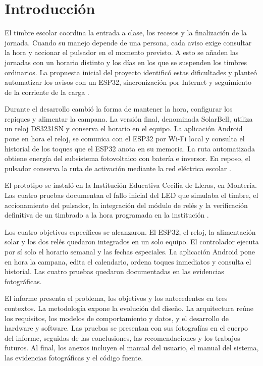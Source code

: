 \documentclass[a4paper,11pt]{article}
\newcommand{\seccionsinnumero}[1]{%
  \section*{#1}\phantomsection\addcontentsline{toc}{section}{#1}}
\begin{document}
\tableofcontents
\clearpage

\seccionsinnumero{Introducción}
El timbre escolar coordina la entrada a clase, los recesos y la finalización de la jornada. Cuando su manejo depende de una persona, cada aviso exige consultar la hora y accionar el pulsador en el momento previsto. A esto se añaden las jornadas con un horario distinto y los días en los que se suspenden los timbres ordinarios. La propuesta inicial del proyecto identificó estas dificultades y planteó automatizar los avisos con un ESP32, sincronización por Internet y seguimiento de la corriente de la carga \cite{propuesta}.

Durante el desarrollo cambió la forma de mantener la hora, configurar los repiques y alimentar la campana. La versión final, denominada SolarBell, utiliza un reloj DS3231SN y conserva el horario en el equipo. La aplicación Android pone en hora el reloj, se comunica con el ESP32 por Wi-Fi local y consulta el historial de los toques que el ESP32 anota en su memoria. La ruta automatizada obtiene energía del subsistema fotovoltaico con batería e inversor. En reposo, el pulsador conserva la ruta de activación mediante la red eléctrica escolar \cite{ficha,diagrama,evidencia}.

El prototipo se instaló en la Institución Educativa Cecilia de Lleras, en Montería. Las cuatro pruebas documentan el fallo inicial del LED que simulaba el timbre, el accionamiento del pulsador, la integración del módulo de relés y la verificación definitiva de un timbrado a la hora programada en la institución \cite{evidencia}.

Los cuatro objetivos específicos se alcanzaron. El ESP32, el reloj, la alimentación solar y los dos relés quedaron integrados en un solo equipo. El controlador ejecuta por sí solo el horario semanal y las fechas especiales. La aplicación Android pone en hora la campana, edita el calendario, ordena toques inmediatos y consulta el historial. Las cuatro pruebas quedaron documentadas en las evidencias fotográficas.

El informe presenta el problema, los objetivos y los antecedentes en tres contextos. La metodología expone la evolución del diseño. La arquitectura reúne los requisitos, los modelos de comportamiento y datos, y el desarrollo de hardware y software. Las pruebas se presentan con sus fotografías en el cuerpo del informe, seguidas de las conclusiones, las recomendaciones y los trabajos futuros. Al final, los anexos incluyen el manual del usuario, el manual del sistema, las evidencias fotográficas y el código fuente.
\end{document}
